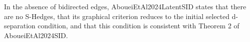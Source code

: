 In the absence of bidirected edges, AboueiEtAl2024LatentSID states that there are no S-Hedges, that its graphical criterion reduces to the initial selected d-separation condition, and that this condition is consistent with Theorem 2 of AboueiEtAl2024SID.